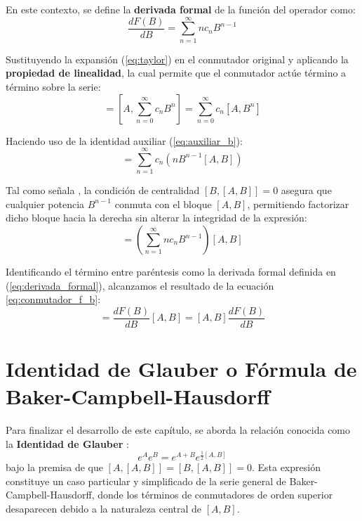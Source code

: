 \documentclass[11pt,a4paper,spanish]{book}
\begin{document}
En este contexto, se define la \textbf{derivada formal} de la función del operador como:
\begin{equation}
\frac{dF(B)}{dB} = \sum_{n=1}^{\infty} n c_n B^{n-1} \label{eq:derivada_formal}
\end{equation}

Sustituyendo la expansión (\ref{eq:taylor}) en el conmutador original y aplicando la \textbf{propiedad de linealidad}, la cual permite que el conmutador actúe término a término sobre la serie:
\begin{equation}
[A, F(B)] = \left[ A, \sum_{n=0}^{\infty} c_n B^n \right] = \sum_{n=0}^{\infty} c_n [A, B^n]
\end{equation}

Haciendo uso de la identidad auxiliar (\ref{eq:auxiliar_b}):
\begin{equation}
[A, F(B)] = \sum_{n=1}^{\infty} c_n \left( n B^{n-1} [A, B] \right)
\end{equation}

Tal como señala \cite{wilcox1967}, la condición de centralidad $[B, [A, B]] = 0$ asegura que cualquier potencia $B^{n-1}$ conmuta con el bloque $[A, B]$, permitiendo factorizar dicho bloque hacia la derecha sin alterar la integridad de la expresión:
\begin{equation}
[A, F(B)] = \left( \sum_{n=1}^{\infty} n c_n B^{n-1} \right) [A, B]
\end{equation}

Identificando el término entre paréntesis como la derivada formal definida en (\ref{eq:derivada_formal}), alcanzamos el resultado de la ecuación \ref{eq:conmutador_f_b}:
\begin{equation}
[A, F(B)] = \frac{dF(B)}{dB} [A, B] = [A, B] \frac{dF(B)}{dB}
\end{equation}

\section{Identidad de Glauber o Fórmula de Baker-Campbell-Hausdorff} \label{sec:BCH}

Para finalizar el desarrollo de este capítulo, se aborda la relación conocida como la \textbf{Identidad de Glauber} \citep{glauber1963}:
\begin{equation}
e^{A} e^{B} = e^{A+B} e^{\frac{1}{2}[A, B]} \label{eq:glauber}
\end{equation}
bajo la premisa de que $[A, [A, B]] = [B, [A, B]] = 0$. Esta expresión constituye un caso particular y simplificado de la serie general de Baker-Campbell-Hausdorff, donde los términos de conmutadores de orden superior desaparecen debido a la naturaleza central de $[A, B]$.
\end{document}
